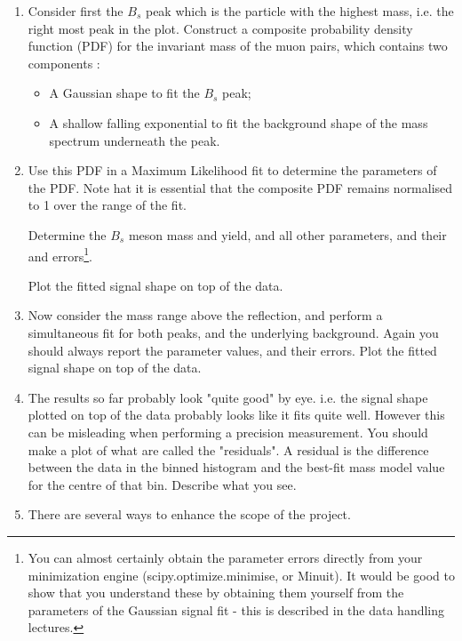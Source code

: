 \begin{enumerate}


\item Consider first the $B_s$ peak which is the particle with the highest
mass, i.e. the right most peak in the plot. Construct a composite probability density
function (PDF) for the invariant mass of the muon pairs, which
contains two components :

\begin{itemize}
\item A Gaussian shape to fit the $B_s$ peak;
\item A shallow falling exponential to fit the background shape of the mass spectrum
underneath the peak.
\end{itemize}

\item Use this PDF in a Maximum Likelihood fit to determine the parameters of the PDF.
Note hat it is essential that the composite PDF remains normalised to 1 over the range
of the fit. 

Determine the $B_s$ meson mass and yield, and all other parameters, and their and
errors\footnote{You can almost certainly obtain the parameter errors directly from your minimization engine (scipy.optimize.minimise, or Minuit). It would be good to show that you understand these by obtaining them yourself from the parameters of the Gaussian signal fit - this is described in the data handling lectures.}.

Plot the fitted signal shape on top of the data.

\item Now consider the mass range above the reflection, and perform a simultaneous fit for both
peaks, and the underlying background. Again you should always report the parameter
values, and their errors. Plot the fitted signal shape on top of the data.

\item The results so far probably look "quite good" by eye.  i.e. the signal shape plotted on top of the data probably looks like it fits quite well.  However this can be misleading when performing a precision measurement.  You should make a plot of what are called the "residuals". A residual is the difference between the data in the binned histogram and the best-fit mass model value for the centre of that bin. Describe what you see.

\newpage

\item There are several ways to enhance the scope of the project.


\end{enumerate}
